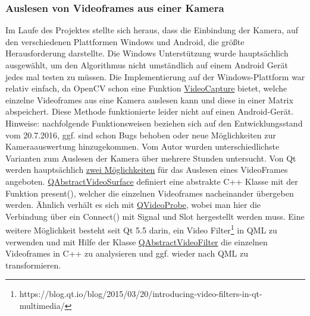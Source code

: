 \subsubsection{Auslesen von Videoframes aus einer Kamera}
Im Laufe des Projektes stellte sich heraus, dass die Einbindung der Kamera, auf den verschiedenen Plattformen Windows und Android, die größte Herausforderung darstellte. Die Windows Unterstützung wurde hauptsächlich ausgewählt, um den Algorithmus nicht umständlich auf einem Android Gerät jedes mal testen zu müssen. Die Implementierung auf der Windows-Plattform war relativ einfach, da OpenCV schon eine Funktion \href{http://docs.opencv.org/3.1.0/d8/dfe/classcv_1_1VideoCapture.html}{VideoCapture} bietet, welche einzelne Videoframes aus eine Kamera auslesen kann und diese in einer Matrix abspeichert. Diese Methode funktionierte leider nicht auf einen Android-Gerät. Hinweise: nachfolgende Funktionsweisen beziehen sich auf den Entwicklungsstand vom 20.7.2016, ggf. sind schon Bugs behoben oder neue Möglichkeiten zur Kameraauswertung hinzugekommen. Vom Autor wurden unterschiedlichste Varianten zum Auslesen der Kamera über mehrere Stunden untersucht. Von Qt werden hauptsächlich \href{http://doc.qt.io/qt-5/videooverview.html}{zwei Möglichkeiten} für das Auslesen eines VideoFrames angeboten. \href{http://doc.qt.io/qt-5/qabstractvideosurface.html}{QAbstractVideoSurface} definiert eine abstrakte C++ Klasse mit der Funktion present(), welcher die einzelnen Videoframes nacheinander übergeben werden. Ähnlich verhält es sich mit \href{http://doc.qt.io/qt-5/qvideoprobe.html}{QVideoProbe}, wobei man hier die Verbindung über ein Connect() mit Signal und Slot hergestellt werden muss. Eine weitere Möglichkeit besteht seit Qt 5.5 darin, ein Video Filter\footnote{\label{video_filter}https://blog.qt.io/blog/2015/03/20/introducing-video-filters-in-qt-multimedia/} in QML zu verwenden und mit Hilfe der Klasse \href{http://doc.qt.io/qt-5/qabstractvideofilter.html}{QAbstractVideoFilter} die einzelnen Videoframes in C++ zu analysieren und ggf. wieder nach QML zu transformieren. 
